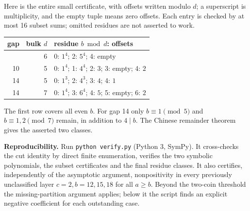 \documentclass[11pt]{article}
\begin{document}
Here is the entire small certificate, with offsets written modulo \(d\);
a superscript is multiplicity, and the empty tuple means zero offsets.
Each entry is checked by at most 16 subset sums; omitted residues are
not asserted to work.

\begin{longtable}[]{@{}rrl@{}}
\toprule\noalign{}
gap & bulk \(d\) & residue \(b\bmod d\): offsets \\
\midrule\noalign{}
\endhead
\bottomrule\noalign{}
\endlastfoot
6 & 6 & 0: \(1^4\); 2: \(5^4\); 4: empty \\
10 & 5 & 0: \(1^4\); 1: \(4^4\); 2: \(3\); 3: empty; 4: \(2\) \\
14 & 5 & 0: \(1^3\); 2: \(4^3\); 3: \(4\); 4: \(1\) \\
14 & 7 & 0: \(1^4\); 3: \(6^4\); 4: \(5\); 5: empty; 6: \(2\) \\
\end{longtable}

The first row covers all even \(b\). For gap 14 only \(b\equiv1\pmod5\)
and \(b\equiv1,2\pmod7\) remain, in addition to \(4\mid b\). The Chinese
remainder theorem gives the asserted two classes.

\textbf{Reproducibility.} Run \texttt{python\ verify.py} (Python 3,
SymPy). It cross-checks the cut identity by direct finite enumeration,
verifies the two symbolic polynomials, the subset certificates and the
final residue classes. It also certifies, independently of the
asymptotic argument, nonpositivity in every previously unclassified
layer \(c=2, b=12,15,18\) for all \(a\ge b\). Beyond the two-coin
threshold the missing-partition argument applies; below it the script
finds an explicit negative coefficient for each outstanding case.
\end{document}
